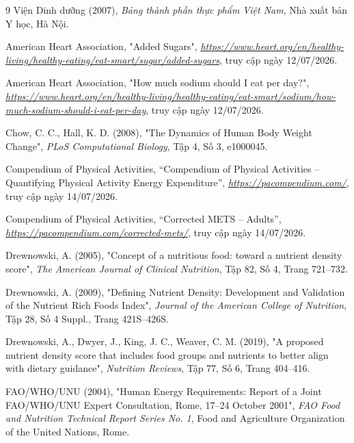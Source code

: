 \documentclass[12pt, a4paper]{report}
\begin{document}
\begin{thebibliography}{9}
Viện Dinh dưỡng (2007),
\textit{Bảng thành phần thực phẩm Việt Nam},
Nhà xuất bản Y học, Hà Nội.

\thispagestyle{empty}

American Heart Association,
"Added Sugars",
\textit{\url{https://www.heart.org/en/healthy-living/healthy-eating/eat-smart/sugar/added-sugars}}, truy cập ngày 12/07/2026.

American Heart Association,
"How much sodium should I eat per day?",
\textit{\url{https://www.heart.org/en/healthy-living/healthy-eating/eat-smart/sodium/how-much-sodium-should-i-eat-per-day}}, truy cập ngày 12/07/2026.

Chow, C. C., Hall, K. D. (2008),
"The Dynamics of Human Body Weight Change",
\textit{PLoS Computational Biology}, Tập 4, Số 3, e1000045.

Compendium of Physical Activities,
``Compendium of Physical Activities -- Quantifying Physical Activity Energy Expenditure'',
\textit{\url{https://pacompendium.com/}},
truy cập ngày 14/07/2026.

Compendium of Physical Activities,
``Corrected METS -- Adults'',
\textit{\url{https://pacompendium.com/corrected-mets/}},
truy cập ngày 14/07/2026.

Drewnowski, A. (2005),
"Concept of a nutritious food: toward a nutrient density score",
\textit{The American Journal of Clinical Nutrition}, Tập 82, Số 4, Trang 721--732.

Drewnowski, A. (2009),
"Defining Nutrient Density: Development and Validation of the Nutrient Rich Foods Index",
\textit{Journal of the American College of Nutrition}, Tập 28, Số 4 Suppl., Trang 421S--426S.

Drewnowski, A., Dwyer, J., King, J. C., Weaver, C. M. (2019),
"A proposed nutrient density score that includes food groups and nutrients to better align with dietary guidance",
\textit{Nutrition Reviews}, Tập 77, Số 6, Trang 404--416.

FAO/WHO/UNU (2004),
"Human Energy Requirements: Report of a Joint FAO/WHO/UNU Expert Consultation, Rome, 17–24 October 2001",
\textit{FAO Food and Nutrition Technical Report Series No. 1},
Food and Agriculture Organization of the United Nations, Rome.


\end{thebibliography}
\end{document}
